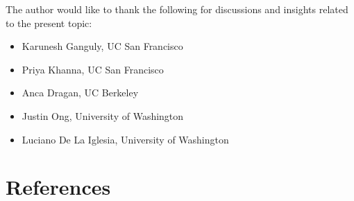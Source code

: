 \documentclass[12pt]{iopart}
\begin{document}
The author would like to thank the following for discussions and insights related to
the present topic:
\begin{itemize}
	\item Karunesh Ganguly, UC San Francisco
	\item Priya Khanna, UC San Francisco
	\item Anca Dragan, UC Berkeley
	\item Justin Ong, University of Washington
	\item Luciano De La Iglesia, University of Washington
\end{itemize}

\section{References}


\end{document}
